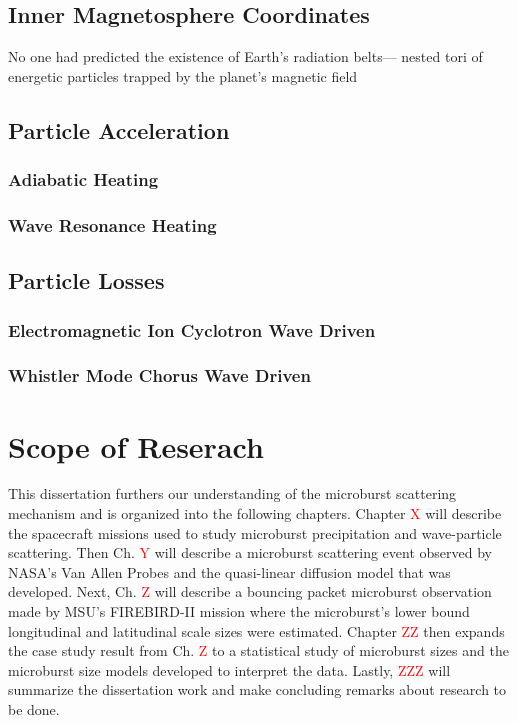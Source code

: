 \subsection{Inner Magnetosphere Coordinates}\label{Intro:coords}


 No one had predicted the
existence of Earth’s radiation belts—
nested tori of energetic particles trapped
by the planet’s magnetic field

\subsection{Particle Acceleration}\label{Intro:acceleration}

\subsubsection{Adiabatic Heating}\label{Intro:adiabatic_heating}

\subsubsection{Wave Resonance Heating}\label{Intro:wave_heating}

\subsection{Particle Losses}\label{Intro:acceleration}

\subsubsection{Electromagnetic Ion Cyclotron Wave Driven}\label{Intro:emic_scattering}

\subsubsection{Whistler Mode Chorus Wave Driven}\label{Intro:chorus_scattering}

\section{Scope of Reserach}\label{Intro:scope}
This dissertation furthers our understanding of the microburst scattering mechanism and is organized into the following chapters. Chapter \textcolor{red}{X} will describe the spacecraft missions used to study microburst precipitation and wave-particle scattering. Then Ch. \textcolor{red}{Y} will describe a microburst scattering event observed by NASA's Van Allen Probes and the quasi-linear diffusion model that was developed. Next, Ch. \textcolor{red}{Z} will describe a bouncing packet microburst observation made by MSU's FIREBIRD-II mission where the microburst's lower bound longitudinal and latitudinal scale sizes were estimated. Chapter \textcolor{red}{ZZ} then expands the case study result from Ch. \textcolor{red}{Z} to a statistical study of microburst sizes and the microburst size models developed to interpret the data. Lastly, \textcolor{red}{ZZZ} will summarize the dissertation work and make concluding remarks about research to be done.

